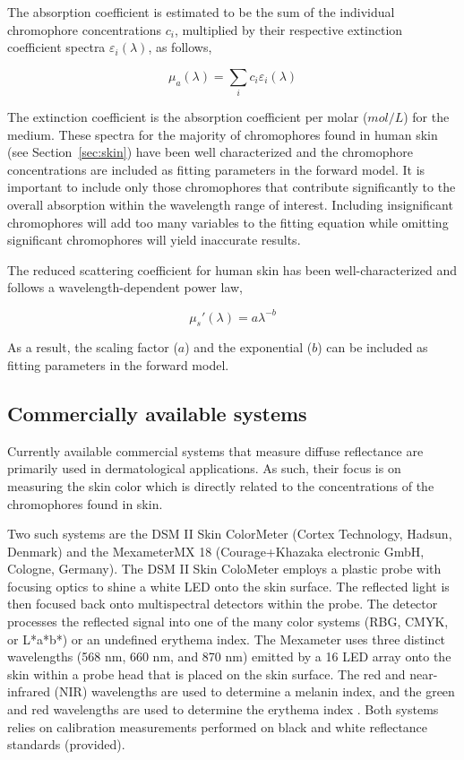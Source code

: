The absorption coefficient is estimated to be the sum of the individual chromophore concentrations $c_i$, multiplied by their respective extinction coefficient spectra $\varepsilon_i(\lambda)$, as follows,

\begin{equation}
\mu_a(\lambda) = \sum_i c_i \varepsilon_i(\lambda)
\end{equation}

The extinction coefficient is the absorption coefficient per molar ($mol/L$) for the medium. These spectra for the majority of chromophores found in human skin (see Section~\ref{sec:skin}) have been well characterized and the chromophore concentrations are included as fitting parameters in the forward model. It is important to include only those chromophores that contribute significantly to the overall absorption within the wavelength range of interest. Including insignificant chromophores will add too many variables to the fitting equation while omitting significant chromophores will yield inaccurate results.

The reduced scattering coefficient for human skin has been well-characterized and follows a wavelength-dependent power law,\cite{Doornbos1999}

\begin{equation}
\mu_s'(\lambda) = a\lambda^{-b}
\end{equation}

As a result, the scaling factor ($a$) and the exponential ($b$) can be included as fitting parameters in the forward model.

\subsection{Commercially available systems}
Currently available commercial systems that measure diffuse reflectance are primarily used in dermatological applications. As such, their focus is on measuring the skin color which is directly related to the concentrations of the chromophores found in skin.

Two such systems are the DSM II Skin ColorMeter (Cortex Technology, Hadsun, Denmark) and the Mexameter\textregistered MX 18 (Courage+Khazaka electronic GmbH, Cologne, Germany). The DSM II Skin ColoMeter employs a plastic probe with focusing optics to shine a white LED onto the skin surface. The reflected light is then focused back onto multispectral detectors within the probe. The detector processes the reflected signal into one of the many color systems (RBG, CMYK, or L*a*b*) or an undefined erythema index. The Mexameter uses three distinct wavelengths (568 nm, 660 nm, and 870 nm) emitted by a 16 LED array onto the skin within a probe head that is placed on the skin surface. The red and near-infrared (NIR) wavelengths are used to determine a melanin index, and the green and red wavelengths are used to determine the erythema index .\cite{Clarys2000} Both systems relies on calibration measurements performed on black and white reflectance standards (provided).

